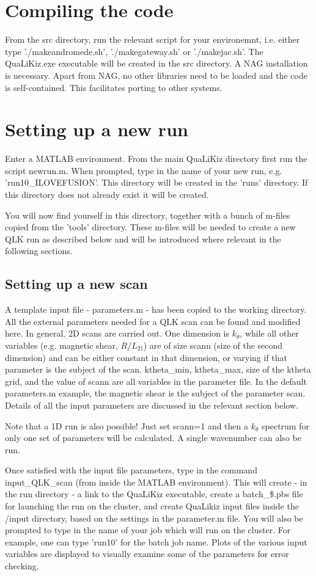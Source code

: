 \documentclass{article}
\begin{document}
\section{Compiling the code}
From the src directory, run the relevant script for your environemnt, i.e. either type './makeandromede.sh', './makegateway.sh' or './makejac.sh'. The QuaLiKiz.exe executable will be created in the src directory. A NAG installation is necessary. Apart from NAG, no other libraries need to be loaded and the code is self-contained. This facilitates porting to other systems.

\section{Setting up a new run}
Enter a MATLAB environment. From the main QuaLiKiz directory first run the script newrun.m. When prompted, type in the name of your new run, e.g. 'run10\_ILOVEFUSION'. This directory will be created in the 'runs' directory. If this directory does not already exist it will be created. 

You will now find yourself in this directory, together with a bunch of m-files copied from the 'tools' directory. These m-files will be needed to create a new QLK run as described below and will be introduced where relevant in the following sections.

\subsection{Setting up a new scan}
A template input file - parameters.m - has been copied to the working directory. All the external parameters needed for a QLK scan can be found and modified here. In general, 2D scans are carried out. One dimension is $k_\theta$, while all other variables (e.g. magnetic shear, $R/L_{Ti}$) are of size scann (size of the second dimension) and can be either constant in that dimension, or varying if that parameter is the subject of the scan. ktheta\_min, ktheta\_max, size of the ktheta grid, and the value of scann are all variables in the parameter file. In the default parameters.m example, the magnetic shear is the subject of the parameter scan. Details of all the input parameters are discussed in the relevant section below.

Note that a 1D run is also possible! Just set scann=1 and then a $k_\theta$ spectrum for only one set of parameters will be calculated. A single wavenumber can also be run. 

Once satisfied with the input file parameters, type in the command input\_QLK\_scan (from inside the MATLAB environment). This will create - in the run directory - a link to the QuaLiKiz executable, create a batch\_\$.pbs file for launching the run on the cluster, and create QuaLikiz input files inside the /input directory, based on the settings in the parameter.m file. You will also be prompted to type in the name of your job which will run on the cluster. For example, one can type 'run10' for the batch job name. Plots of the various input variables are displayed to visually examine some of the parameters for error checking.
\end{document}
